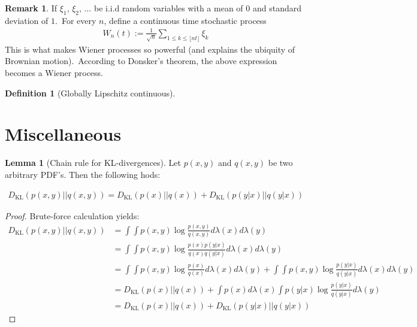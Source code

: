 \documentclass[12pt, a4paper]{article}
\numberwithin{equation}{section}
\theoremstyle{definition}
\theoremstyle{definition}
\newtheorem{defn}[thm]{Definition} %
\newtheorem{lemma}[thm]{Lemma} %
\newtheorem{remark}[thm]{Remark} %
\begin{document}
\begin{remark}
	If $\xi_{1}$, $\xi_{2}$, $\dots$ be i.i.d random variables with a mean of $0$ and standard deviation of $1$.\ For every $n$, define a continuous time stochastic process 
	\begin{align}\label{random_walk_Wiener}
		W_{n}(t) := \frac{1}{\sqrt{n}}\sum_{1\leq k\leq\lfloor nt \rfloor}\xi_{k} 
	\end{align}
	This is what makes Wiener processes so powerful (and explains the ubiquity of Brownian motion).\ According to Donsker's theorem, the  above expression becomes a Wiener process.
\end{remark}

\begin{defn}[Globally Lipschitz continuous]
	
	
\end{defn}

\newpage 

\section{Miscellaneous}

	\begin{lemma}[Chain rule for KL-divergences]
		Let $p(x, y)$ and $q(x, y)$ be two arbitrary PDF's. Then the following hods:
		
		\begin{align}
			D_{\text{KL}}(p(x, y) \vert\vert q(x, y)) = D_{\text{KL}}(p(x)\vert\vert q(x)) + D_{\text{KL}}(p(y\vert x) \vert\vert q(y\vert x))
		\end{align}
		
		\begin{proof}
			Brute-force calculation yields:
			\begin{align}
				D_{\text{KL}}(p(x, y) \vert\vert q(x, y)) &= \int\int p(x, y)\log\frac{p(x, y)}{q(x, y)}d\lambda(x)d\lambda(y)
				\\[4pt] &= \int\int p(x, y)\log\frac{p(x)p(y\vert x)}{q(x)q(y\vert x)}d\lambda(x)d\lambda(y)
				\\[4pt] &= \int\int p(x, y)\log\frac{p(x)}{q(x)}d\lambda(x)d\lambda(y) + \int\int p(x, y)\log\frac{p(y\vert x)}{q(y\vert x)}d\lambda(x)d\lambda(y)
				\\[4pt] &= D_{\text{KL}}(p(x) \vert\vert q(x)) + \int p(x)d\lambda(x)\int p(y\vert x)\log\frac{p(y\vert x)}{q(y\vert x)}d\lambda(y)
				\\[4pt] &= D_{\text{KL}}(p(x) \vert\vert q(x)) + D_{\text{KL}}(p(y\vert x) \vert\vert q(y\vert x))
			\end{align}
		\end{proof}
	\end{lemma}
	
\end{document}
